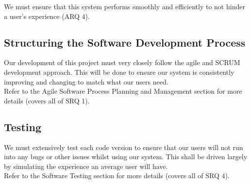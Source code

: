 \documentclass[12pt]{article}
\begin{document}
We must ensure that this system performs smoothly and efficiently to not hinder
a user's experience (ARQ 4).


\subsection{Structuring the Software Development Process}

Our development of this project must very closely follow the agile and SCRUM
development approach. This will be done to ensure our system is consistently
improving and changing to match what our users need.\\

Refer to the Agile Software Process Planning and Management section for more details (covers all of SRQ 1).


\subsection{Testing}
We must extensively test each code version to ensure that our users will not run into any bugs or other issues whilst using our system. This shall be driven largely by simulating the experience an average user will have.\\

Refer to the Software Testing section for more details (covers all of SRQ 4).
\end{document}
